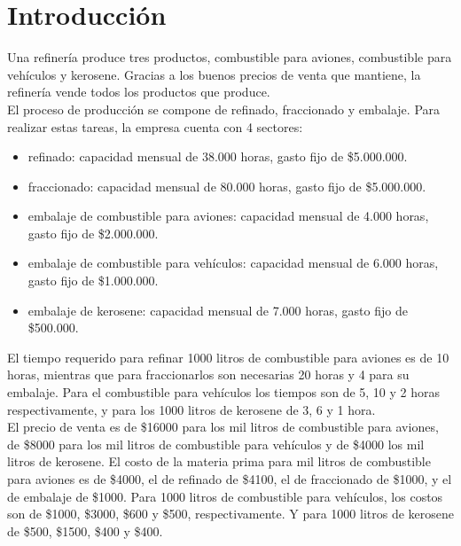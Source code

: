 \documentclass[10pt,a4paper]{article}
\begin{document}
\maketitle



\section{Introducción} 

Una refinería produce tres productos, combustible para aviones, combustible para vehículos y kerosene. Gracias a
los buenos precios de venta que mantiene, la refinería vende todos los productos que produce. \\ 

El proceso de producción se compone de refinado, fraccionado y embalaje. Para realizar estas tareas, la empresa cuenta con 4 sectores:


\begin{itemize}
	\item refinado: capacidad mensual de 38.000 horas, gasto fijo de \$5.000.000.
	\item fraccionado: capacidad mensual de 80.000 horas, gasto fijo de \$5.000.000.
	\item embalaje de combustible para aviones: capacidad mensual de 4.000 horas, gasto fijo de \$2.000.000.
	\item embalaje de combustible para vehículos: capacidad mensual de 6.000 horas, gasto fijo de \$1.000.000.
	\item embalaje de kerosene: capacidad mensual de 7.000 horas, gasto fijo de \$500.000.
\end{itemize}

El tiempo requerido para refinar 1000 litros de combustible para aviones es de 10 horas, mientras que para fraccionarlos son necesarias 20 horas y 4 para su embalaje. 
Para el combustible para vehículos los tiempos son de 5, 10 y 2 horas respectivamente, y para los 1000 litros de kerosene de 3, 6 y 1 hora. \\ 

El precio de venta es de \$16000 para los mil litros de combustible para aviones, de \$8000 para los mil litros de
combustible para vehículos y de \$4000 los mil litros de kerosene. El costo de la materia prima para mil litros de
combustible para aviones es de \$4000, el de refinado de \$4100, el de fraccionado de \$1000, y el de embalaje de
\$1000. Para 1000 litros de combustible para vehículos, los costos son de \$1000, \$3000, \$600 y \$500, respectivamente.
Y para 1000 litros de kerosene de \$500, \$1500, \$400 y \$400. \\
\end{document}
